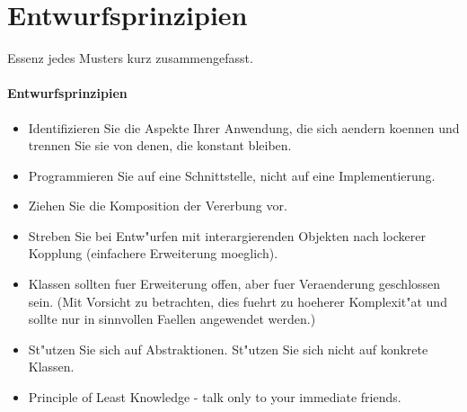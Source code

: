 \section{Entwurfsprinzipien}
Essenz jedes Musters kurz zusammengefasst. 

\paragraph{Entwurfsprinzipien}

\begin{itemize}[leftmargin=0.2in]
	\item Identifizieren Sie die Aspekte Ihrer Anwendung, die sich aendern koennen und trennen Sie sie 
  von denen, die konstant bleiben.
	\item Programmieren Sie auf eine Schnittstelle, nicht auf eine Implementierung.
	\item Ziehen Sie die Komposition der Vererbung vor.
	\item Streben Sie bei Entw"urfen mit interargierenden Objekten nach lockerer Kopplung (einfachere 
Erweiterung moeglich).
	\item Klassen sollten fuer Erweiterung offen, aber fuer Veraenderung geschlossen sein. (Mit Vorsicht zu 
betrachten, dies fuehrt zu hoeherer Komplexit"at und sollte nur in sinnvollen Faellen 
angewendet werden.)
	\item St"utzen Sie sich auf Abstraktionen. St"utzen Sie sich nicht auf konkrete Klassen.  
	\item Principle of Least Knowledge - talk only to your immediate friends.
\end{itemize}

